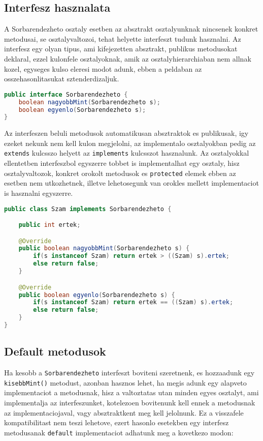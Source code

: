 \documentclass{article}
\let\l\lstinline
\begin{document}
\newpage

\subsection{Interfesz hasznalata}

A Sorbarendezheto osztaly esetben az absztrakt osztalyunknak nincsenek konkret metodusai, se osztalyvaltozoi, tehat helyette interfeszt tudunk hasznalni. Az interfesz egy olyan tipus, ami kifejezetten absztrakt, publikus metodusokat deklaral, ezzel kulonfele osztalyoknak, amik az osztalyhierarchiaban nem allnak kozel, egyseges kulso eleresi modot adunk, ebben a peldaban az osszehasonlitasukat sztenderdizaljuk.

\begin{lstlisting}[language=Java, caption=Sorbarendezheto interface]
public interface Sorbarendezheto {
	boolean nagyobbMint(Sorbarendezheto s);
	boolean egyenlo(Sorbarendezheto s);
}
\end{lstlisting}

Az interfeszen beluli metodusok automatikusan absztraktok es publikusak, igy ezeket nekunk nem kell kulon megjelolni, az implementalo osztalyokban pedig az \l{extends} kulcsszo helyett az \l{implements} kulcsszot hasznalunk. Az osztalyokkal ellentetben interfeszbol egyszerre tobbet is implementalhat egy osztaly, hisz osztalyvaltozok, konkret orokolt metodusok es \l{protected} elemek ebben az esetben nem utkozhetnek, illetve lehetosegunk van orokles mellett implementaciot is hasznalni egyszerre.

\begin{lstlisting}[language=Java, caption=Sorbarendezheto interface]
public class Szam implements Sorbarendezheto {

	public int ertek;

	@Override
	public boolean nagyobbMint(Sorbarendezheto s) {
		if(s instanceof Szam) return ertek > ((Szam) s).ertek;
		else return false;
	}

	@Override
	public boolean egyenlo(Sorbarendezheto s) {
		if(s instanceof Szam) return ertek == ((Szam) s).ertek;
		else return false;
	}
}
\end{lstlisting}

\newpage

\subsection{Default metodusok}

Ha kesobb a \l{Sorbarendezheto} interfeszt boviteni szeretnenk, es hozzaadunk egy \l{kisebbMint()} metodust, azonban hasznos lehet, ha megis adunk egy alapveto implementaciot a metodusnak, hisz a valtoztatas utan minden egyes osztalyt, ami implementalja az interfeszunket, kotelezoen bovitenunk kell ennek a metodusnak az implementaciojaval, vagy absztraktkent meg kell jelolnunk. Ez a visszafele kompatibilitast nem teszi lehetove, ezert hasonlo esetekben egy interfesz metodusanak \l{default} implementaciot adhatunk meg a kovetkezo modon:
\end{document}
